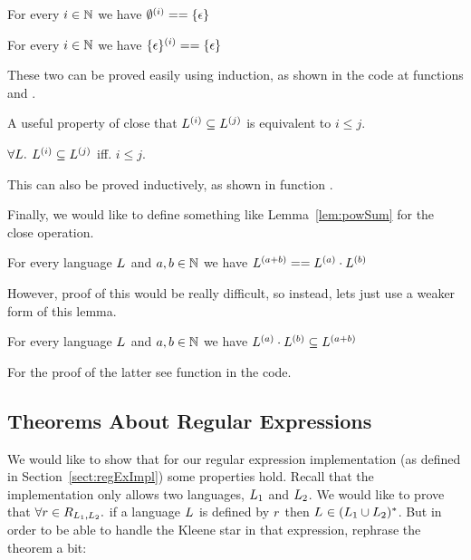 \begin{lemma}
	\label{lem:nullLangClose}
	For every $i \in \mathbb{N}$ we have $\emptyset^{(i)} == \{\epsilon\}$
\end{lemma}

\begin{lemma}
	\label{lem:unitLangClose}
	For every $i \in \mathbb{N}$ we have $\{\epsilon\}^{(i)} == \{\epsilon\}$
\end{lemma}

These two can be proved easily using induction, as shown in the code at functions  and .

A useful property of close that $L^{(i)} \subseteq L^{(j)}$ is equivalent to $i \le j$.

\begin{lemma}
	\label{lem:subsetCloseLe}
	$\forall L.$  $L^{(i)} \subseteq L^{(j)}$ iff. $i \le j$.
\end{lemma}

This can also be proved inductively, as shown in function .

Finally, we would like to define something like Lemma~\ref{lem:powSum} for the close operation.

\begin{lemma}
	\label{lem:sumCloseSame}
	For every language $L_{}$ and $a,b \in \mathbb{N}$ we have $L^{(a+b)} == L^{(a)} \cdot L^{(b)} $
\end{lemma}

However, proof of this would be really difficult, so instead, lets just use a weaker form of this lemma.

\begin{lemma}
	\label{lem:sumClose}
	For every language $L_{}$ and $a,b \in \mathbb{N}$ we have $L^{(a)} \cdot L^{(b)} \subseteq L^{(a+b)}$
\end{lemma}

For the proof of the latter see function  in the code.

\subsection{Theorems About Regular Expressions}
\label{sect:thmRegEx}
We would like to show that for our regular expression implementation (as defined in Section~\ref{sect:regExImpl}) some properties hold. Recall that the implementation only allows two languages, $L_{1}$ and $L_{2}$. We would like to prove that $\forall r \in R_{L_{1}, L_{2}}.$ if a language $L_{}$ is defined by $r$ then $L_{} \in (L_{1} \cup L_{2})^{*}$. But in order to be able to handle the Kleene star in that expression, rephrase the theorem a bit:

